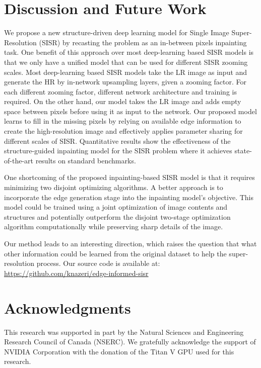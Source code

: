 \documentclass[10pt,twocolumn,letterpaper]{article}
\begin{document}
\section{Discussion and Future Work}
We propose a new structure-driven deep learning model for Single Image Super-Resolution (SISR) by recasting the problem as an in-between pixels inpainting task. One benefit of this approach over most deep-learning based SISR models is that we only have a unified model that can be used for different SISR zooming scales. Most deep-learning based SISR models take the LR image as input and generate the HR by in-network upsampling layers, given a zooming factor. For each different zooming factor, different network architecture and training is required. On the other hand, our model takes the LR image and adds empty space between pixels before using it as input to the network. Our proposed model learns to fill in the missing pixels by relying on available edge information to create the high-resolution image and effectively applies parameter sharing for different scales of SISR. Quantitative results show the effectiveness of the structure-guided inpainting model for the SISR problem where it achieves state-of-the-art results on standard benchmarks. 

One shortcoming of the proposed inpainting-based SISR model is that it requires minimizing two disjoint optimizing algorithms. A better approach is to incorporate the edge generation stage into the inpainting model's objective. This model could be trained using a joint optimization of image contents and structures and potentially outperform the disjoint two-stage optimization algorithm computationally while preserving sharp details of the image. 

Our method leads to an interesting direction, which raises the question that what other information could be learned from the original dataset to help the super-resolution process. Our source code is available at:\\ {\footnotesize\url{https://github.com/knazeri/edge-informed-sisr}}
\section*{Acknowledgments} This research was supported in part by the Natural Sciences and Engineering Research Council of Canada (NSERC). We gratefully acknowledge the support of NVIDIA Corporation with the donation of the Titan V GPU used for this research.
\newpage


\end{document}
